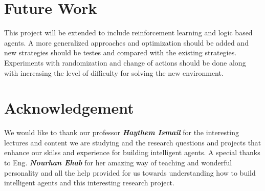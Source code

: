 \documentclass{article}
\begin{document}
\section{Future Work}

This project will be extended to include reinforcement learning and logic based agents. A more generalized approaches and optimization should be added and new strategies should be testes and compared with the existing strategies. Experiments with randomization and change of actions should be done along with increasing the level of difficulty for solving the new environment.

\section{Acknowledgement}

We would like to thank our professor \textbf{\textit{Haythem Ismail}} for the interesting lectures and content we are studying and the research questions and projects that enhance our skilss and experience for building intelligent agents. A special thanks to Eng. \textbf{\textit{Nourhan Ehab}} for her amazing way of teaching and wonderful personality and all the help provided for us towards understanding how to build intelligent agents and this interesting research project.



  
\end{document}
